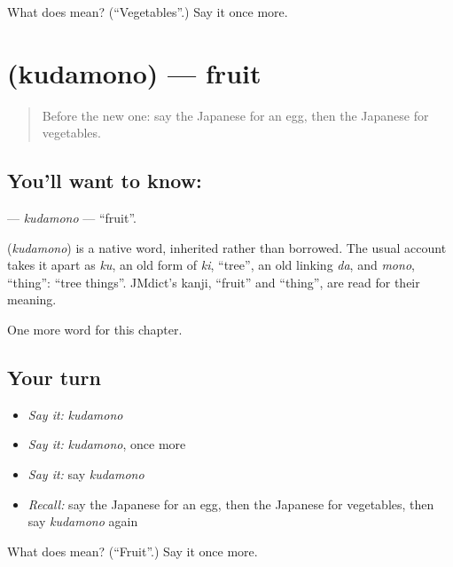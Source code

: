 \begin{tcolorbox}[breakable,colback=teal!4,colframe=teal!35!black,title={Before you move on}]
What does  mean? (\textquotedblleft{}Vegetables\textquotedblright{}.) Say it once more.
\end{tcolorbox}
\section[\texorpdfstring{\ja{くだもの} (kudamono)}{くだもの (kudamono)}]{ (kudamono) — fruit}

\label{lesson:JA-C32-kudamono}



\begin{quote}
Before the new one: say the Japanese for an egg, then the Japanese for vegetables.
\end{quote}

\subsection*{You'll want to know: }
\textbf{} — \emph{kudamono} — \textquotedblleft{}fruit\textquotedblright{}.

\begin{cousinweb}
\textbf{} (\emph{kudamono}) is a native word, inherited rather than borrowed. The usual account takes it apart as \emph{ku}, an old form of \emph{ki}, \textquotedblleft{}tree\textquotedblright{}, an old linking \emph{da}, and \emph{mono}, \textquotedblleft{}thing\textquotedblright{}: \textquotedblleft{}tree things\textquotedblright{}. JMdict's kanji, \textquotedblleft{}fruit\textquotedblright{} and \textquotedblleft{}thing\textquotedblright{}, are read for their meaning.
\end{cousinweb}

\begin{grammarlens}[title={What you've built}]
One more word for this chapter.
\end{grammarlens}

\subsection*{Your turn}
\begin{itemize}
\raggedright
  \item \emph{Say it:} \emph{kudamono}
  \item \emph{Say it:} \emph{kudamono}, once more
  \item \emph{Say it:} say \emph{kudamono}
  \item \emph{Recall:} say the Japanese for an egg, then the Japanese for vegetables, then say \emph{kudamono} again
\end{itemize}

\begin{tcolorbox}[breakable,colback=teal!4,colframe=teal!35!black,title={Before you move on}]
What does  mean? (\textquotedblleft{}Fruit\textquotedblright{}.) Say it once more.
\end{tcolorbox}
